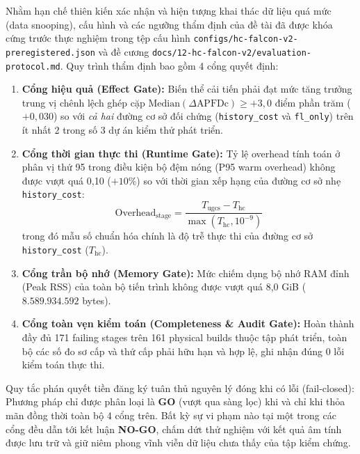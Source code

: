 Nhằm hạn chế thiên kiến xác nhận và hiện tượng khai thác dữ liệu quá mức (data snooping), cấu hình và các ngưỡng thẩm định của đề tài đã được khóa cứng trước thực nghiệm trong tệp cấu hình \texttt{configs/hc-falcon-v2-preregistered.json} và đề cương \texttt{docs/12-hc-falcon-v2/evaluation-protocol.md}. Quy trình thẩm định bao gồm 4 cổng quyết định:
\begin{enumerate}
    \item \textbf{Cổng hiệu quả (Effect Gate):} Biến thể cải tiến phải đạt mức tăng trưởng trung vị chênh lệch ghép cặp $\text{Median}(\Delta\text{APFDc}) \ge +3,0$ điểm phần trăm ($+0,030$) so với \textit{cả hai} đường cơ sở đối chứng (\texttt{history\_cost} và \texttt{fl\_only}) trên ít nhất 2 trong số 3 dự án kiểm thử phát triển.
    \item \textbf{Cổng thời gian thực thi (Runtime Gate):} Tỷ lệ overhead tính toán ở phân vị thứ 95 trong điều kiện bộ đệm nóng (P95 warm overhead) không được vượt quá 0,10 ($+10\%$) so với thời gian xếp hạng của đường cơ sở nhẹ \texttt{history\_cost}:
    \begin{equation}
    \text{Overhead}_{\text{stage}} = \frac{T_{\text{ugcs}} - T_{\text{hc}}}{\max(T_{\text{hc}}, 10^{-9})}
    \end{equation}
    trong đó mẫu số chuẩn hóa chính là độ trễ thực thi của đường cơ sở \texttt{history\_cost} ($T_{\text{hc}}$).
    \item \textbf{Cổng trần bộ nhớ (Memory Gate):} Mức chiếm dụng bộ nhớ RAM đỉnh (Peak RSS) của toàn bộ tiến trình không được vượt quá 8,0 GiB ($8.589.934.592$ bytes).
    \item \textbf{Cổng toàn vẹn kiểm toán (Completeness \& Audit Gate):} Hoàn thành đầy đủ 171 failing stages trên 161 physical builds thuộc tập phát triển, toàn bộ các số đo sơ cấp và thứ cấp phải hữu hạn và hợp lệ, ghi nhận đúng 0 lỗi kiểm toán thực thi.
\end{enumerate}

Quy tắc phán quyết tiền đăng ký tuân thủ nguyên lý đóng khi có lỗi (fail-closed): Phương pháp chỉ được phân loại là \textbf{GO} (vượt qua sàng lọc) khi và chỉ khi thỏa mãn đồng thời toàn bộ 4 cổng trên. Bất kỳ sự vi phạm nào tại một trong các cổng đều dẫn tới kết luận \textbf{NO-GO}, chấm dứt thử nghiệm với kết quả âm tính được lưu trữ và giữ niêm phong vĩnh viễn dữ liệu chưa thấy của tập kiểm chứng.


